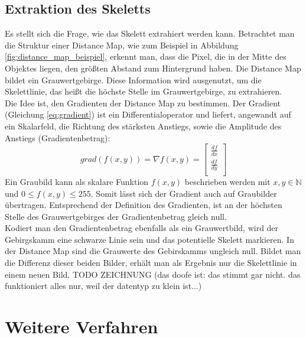 \subsection{Extraktion des Skeletts}
Es stellt sich die Frage, wie das Skelett extrahiert werden kann. Betrachtet man die Struktur einer
Distance Map, wie zum Beispiel in Abbildung \ref{fig:distance_map_beispiel}, erkennt man, dass die Pixel,
die in der Mitte des Objektes liegen, den größten Abstand zum Hintergrund haben. Die Distance Map bildet ein Grauwertgebirge. Diese Information wird ausgenutzt, um die Skelettlinie, das heißt die höchste Stelle
im Grauwertgebirge, zu extrahieren. \\
Die Idee ist, den Gradienten der Distance Map zu bestimmen. Der Gradient (Gleichung \ref{eq:gradient}) ist ein Differentialoperator und liefert, angewandt auf ein Skalarfeld, die Richtung des stärksten Anstiegs, sowie die Amplitude des Anstiegs (Gradientenbetrag):
\begin{equation}
\label{eq:gradient}
   grad(f(x,y)) = \nabla f(x,y) = \begin{bmatrix}
         \frac{df}{dx}        \\[0.3em]
         \frac{df}{dy} \\[0.3em]
      \end{bmatrix}
\end{equation}
Ein Graubild kann als skalare Funktion $f(x,y)$ beschrieben werden mit $x,y \in \mathbb{N}$ und
$0 \leq f(x,y) \leq 255$. Somit lässt sich der Gradient auch auf Graubilder übertragen.
Entsprechend der Definition des Gradienten, ist an der höchsten Stelle des Grauwertgebirges der Gradientenbetrag gleich null.\\
Kodiert man den Gradientenbetrag ebenfalls als ein Grauwertbild, wird der Gebirgskamm eine schwarze Linie
sein und das potentielle Skelett markieren. In der Distance Map sind die Grauwerte des Gebirskamms ungleich
null. Bildet man die Differenz dieser beiden Bilder, erhält man als Ergebnis nur die Skelettlinie in
einem neuen Bild. TODO ZEICHNUNG (das doofe ist: das stimmt gar nicht. das funktioniert alles nur, weil der datentyp zu klein ist...)
\section{Weitere Verfahren}
